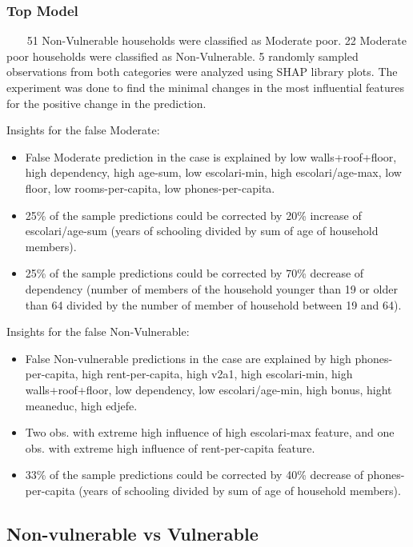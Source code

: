     \subsubsection{Top Model}~~~
        51 Non-Vulnerable households were classified as Moderate poor. 22 Moderate poor households were classified as Non-Vulnerable. 5 randomly sampled observations from both categories were analyzed using SHAP library plots. The experiment was done to find the minimal changes in the most influential features for the positive change in the prediction.
        
        Insights for the false Moderate:
        \begin{itemize}
            \item False Moderate prediction in the case is explained by low walls+roof+floor, high dependency, high age-sum, low escolari-min, high escolari/age-max, low floor, low rooms-per-capita, low phones-per-capita.
            \item 25\% of the sample predictions could be corrected by 20\% increase of escolari/age-sum (years of schooling divided by sum of age of household members). 
            \item 25\% of the sample predictions could be corrected by 70\% decrease of dependency (number of members of the household younger than 19 or older than 64 divided by the number of member of household between 19 and 64). 

        \end{itemize}
        Insights for the false Non-Vulnerable:
        \begin{itemize}
            \item False Non-vulnerable predictions in the case are explained by high phones-per-capita, high rent-per-capita, high v2a1, high escolari-min, high walls+roof+floor, low dependency, low escolari/age-min, high bonus, hight meaneduc, high edjefe.
            \item Two obs. with extreme high influence of high escolari-max feature, and one obs. with extreme high influence of rent-per-capita feature.
            \item 33\% of the sample predictions could be corrected by 40\% decrease of phones-per-capita (years of schooling divided by sum of age of household members). 
        \end{itemize}
        
    \subsection{Non-vulnerable vs Vulnerable}
